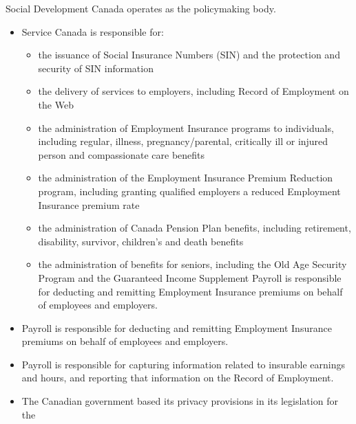 \documentclass[letterpaper,10pt,english]{sphinxmanual}
\begin{document}
\sphinxAtStartPar
Social Development Canada operates as the policy\sphinxhyphen{}making body.
\begin{itemize}
\item {} 
\sphinxAtStartPar
Service Canada is responsible for:
\begin{itemize}
\item {} 
\sphinxAtStartPar
the issuance of Social Insurance Numbers (SIN) and the protection and security of SIN information

\item {} 
\sphinxAtStartPar
the delivery of services to employers, including Record of Employment on the Web

\item {} 
\sphinxAtStartPar
the administration of Employment Insurance programs to individuals, including regular, illness, pregnancy/parental, critically ill or injured person and compassionate care benefits

\item {} 
\sphinxAtStartPar
the administration of the Employment Insurance Premium Reduction program, including granting qualified employers a reduced Employment Insurance premium rate

\item {} 
\sphinxAtStartPar
the administration of Canada Pension Plan benefits, including retirement, disability, survivor, children’s and death benefits

\item {} 
\sphinxAtStartPar
the administration of benefits for seniors, including the Old Age Security Program and the Guaranteed Income Supplement Payroll is responsible for deducting and remitting Employment Insurance premiums on behalf of employees and employers.

\end{itemize}

\item {} 
\sphinxAtStartPar
Payroll is responsible for deducting and remitting Employment Insurance premiums on behalf of employees and employers.

\item {} 
\sphinxAtStartPar
Payroll is responsible for capturing information related to insurable earnings and hours, and reporting that information on the Record of Employment.

\item {} 
\sphinxAtStartPar
The Canadian government based its privacy provisions in its legislation for the

\end{itemize}
\end{document}
